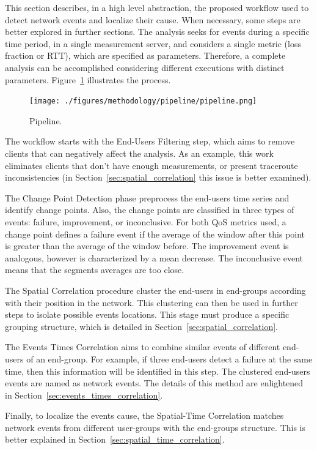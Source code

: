 This section describes, in a high level abstraction, the proposed workflow
used to detect network events and localize their cause. When necessary, some
steps are better explored in further sections.
The analysis seeks for events during a specific time period, in a single
measurement server, and considers a
single metric (loss fraction or RTT), which are specified as parameters.
Therefore, a complete analysis can be accomplished considering different
executions with distinct parameters.
Figure~\ref{fig:pipeline} illustrates the process.

\begin{figure}[H]
    \centering
    \texttt{[image: ./figures/methodology/pipeline/pipeline.png]}
    \caption{Pipeline.}
\label{fig:pipeline}
\end{figure}%

The workflow starts with the End-Users Filtering step,
which aims to remove clients that can negatively affect the analysis.
As an example, this work eliminates clients
that don't have enough measurements, or present
traceroute inconsistencies (in Section~\ref{sec:spatial_correlation}
this issue is better examined).

The Change Point Detection phase preprocess the end-users time series and
identify change points.
Also, the change points are classified in three types of events: failure,
improvement, or inconclusive. For both QoS metrics used,
a change point defines a
failure event if the average of the window after this point is greater than the
average of the window before. The improvement event is analogous, however is
characterized by a mean decrease.
The inconclusive event means that the segments averages are too close.

The Spatial Correlation procedure cluster the end-users in end-groups
according with their position in the network. This clustering can then be used
in further steps to isolate possible events locations.
This stage must produce a specific grouping structure, which is detailed in
Section~\ref{sec:spatial_correlation}.

The Events Times Correlation aims to combine similar events of different
end-users of an end-group. For example, if three end-users detect a failure at
the same time, then this information will be identified in this step.
The clustered end-users events are named as network events.
The details of this method are enlightened in
Section~\ref{sec:events_times_correlation}.

Finally, to localize the events cause, the Spatial-Time Correlation
matches network events
from different user-groups with the end-groups structure.
This is better explained in Section~\ref{sec:spatial_time_correlation}.

